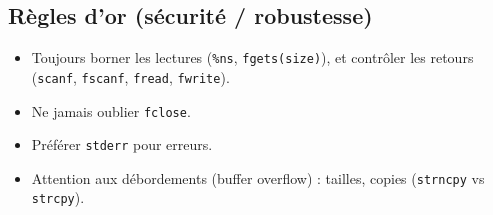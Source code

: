\subsection{Règles d’or (sécurité / robustesse)}
\begin{itemize}
  \item Toujours borner les lectures (\texttt{\%ns}, \texttt{fgets(size)}), et contrôler les retours (\texttt{scanf}, \texttt{fscanf}, \texttt{fread}, \texttt{fwrite}). 
  \item Ne jamais oublier \texttt{fclose}.
  \item Préférer \texttt{stderr} pour erreurs.
  \item Attention aux débordements (buffer overflow) : tailles, copies (\texttt{strncpy} vs \texttt{strcpy}).
\end{itemize}
